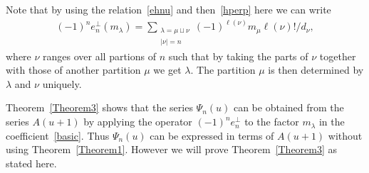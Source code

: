 \documentclass[11pt]{article}
\numberwithin{equation}{section}
\begin{document}
Note that by using the relation~\eqref{ehnu} and then~\eqref{hperp} here we can write
\begin{gather}\label{firstfactor}
(-1)^ne_n^{\perp}(m_\lambda)
=\sum\limits_{\substack{\lambda=\mu\sqcup\nu\\|\nu|=n}}(-1)^{\ell(\nu)}m_\mu\ell(\nu)!/d_\nu,
\end{gather}
where $\nu$ ranges over all partions of $n$ such that by taking the parts of $\nu$ together with those of
another partition $\mu$ we get $\lambda$.
The partition $\mu$ is then determined by $\lambda$ and $\nu$ uniquely.

Theorem~\ref{Theorem3} shows that the series $\Psi_n(u)$ can be obtained from the series $A(u+1)$ by applying the
operator $(-1)^ne_n^{\perp}$ to the factor $m_\lambda$ in the
coef\/f\/icient~\eqref{basic}.
Thus $\Psi_n(u)$ can be expressed in terms of $A(u+1)$ without using Theorem~\ref{Theorem1}.
However we will prove Theorem~\ref{Theorem3} as stated here.
\end{document}
